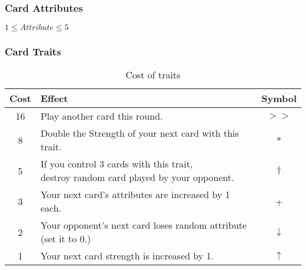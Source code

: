 \documentclass{article}
\begin{document}
\subsubsection{Card Attributes}
    $1 \leq Attribute \leq 5$
\subsubsection{Card Traits}

\begin{table}[h]
    \begin{tabular}{ | c | l | c |}
        \hline
        Cost & Effect & Symbol\\ \hline
        16 & Play another card this round. & $>>$ \\  \hline
        8 & Double the Strength of your next card with this trait. & * \\ \hline
        5 & \pbox{25cm}{If you control 3 cards with this trait, \\destroy random card played by your opponent.}  & $\dagger$ \\  \hline
        3 & Your next card's attributes are increased by 1 each. & +\\ \hline
        2 & Your opponent's next card loses random attribute (set it to 0.) & $\downarrow$ \\ \hline
        1 & Your next card strength is increased by 1.& $\uparrow$ \\ \hline
    \end{tabular}
\caption{Cost of traits}
\label{tab:traitcost}
\end{table}
\end{document}
